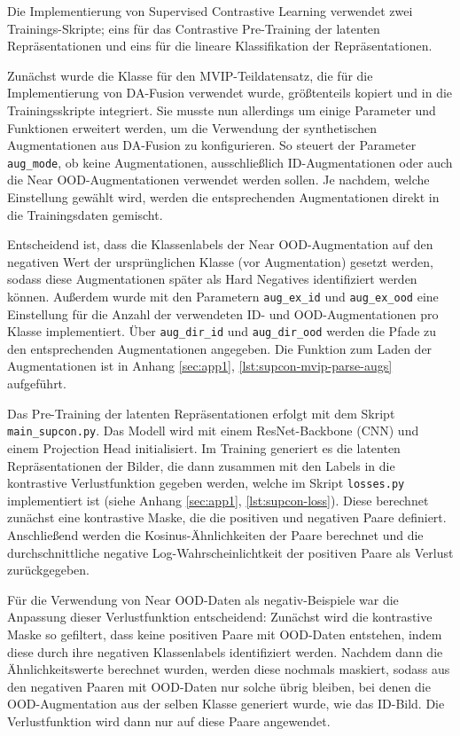 Die Implementierung von Supervised Contrastive Learning verwendet zwei Trainings-Skripte; eins für das Contrastive Pre-Training der latenten Repräsentationen und eins für die lineare Klassifikation der Repräsentationen.

Zunächst wurde die Klasse für den MVIP-Teildatensatz, die für die Implementierung von DA-Fusion verwendet wurde, größtenteils kopiert und in die Trainingsskripte integriert. Sie musste nun allerdings um einige Parameter und Funktionen erweitert werden, um die Verwendung der synthetischen Augmentationen aus DA-Fusion zu konfigurieren. So steuert der Parameter \lstinline{aug_mode}, ob keine Augmentationen, ausschließlich ID-Augmentationen oder auch die Near OOD-Augmentationen verwendet werden sollen. Je nachdem, welche Einstellung gewählt wird, werden die entsprechenden Augmentationen direkt in die Trainingsdaten gemischt. %

Entscheidend ist, dass die Klassenlabels der Near OOD-Augmentation auf den negativen Wert der ursprünglichen Klasse (vor Augmentation) gesetzt werden, sodass diese Augmentationen später als Hard Negatives identifiziert werden können. Außerdem wurde mit den Parametern \lstinline{aug_ex_id} und \lstinline{aug_ex_ood} eine Einstellung für die Anzahl der verwendeten ID- und OOD-Augmentationen pro Klasse implementiert. Über \lstinline{aug_dir_id} und \lstinline{aug_dir_ood} werden die Pfade zu den entsprechenden Augmentationen angegeben. Die Funktion zum Laden der Augmentationen ist in Anhang \ref{sec:app1}, \autoref{lst:supcon-mvip-parse-augs} aufgeführt.

Das Pre-Training der latenten Repräsentationen erfolgt mit dem Skript \lstinline{main_supcon.py}. Das Modell wird mit einem ResNet-Backbone (CNN) und einem Projection Head initialisiert. Im Training generiert es die latenten Repräsentationen der Bilder, die dann zusammen mit den Labels in die kontrastive Verlustfunktion gegeben werden, welche im Skript \lstinline{losses.py} implementiert ist (siehe Anhang \ref{sec:app1}, \autoref{lst:supcon-loss}). Diese berechnet zunächst eine kontrastive Maske, die die positiven und negativen Paare definiert. Anschließend werden die Kosinus-Ähnlichkeiten der Paare berechnet und die durchschnittliche negative Log-Wahrscheinlichtkeit der positiven Paare als Verlust zurückgegeben.

Für die Verwendung von Near OOD-Daten als negativ-Beispiele war die Anpassung dieser Verlustfunktion entscheidend: Zunächst wird die kontrastive Maske so gefiltert, dass keine positiven Paare mit OOD-Daten entstehen, indem diese durch ihre negativen Klassenlabels identifiziert werden. Nachdem dann die Ähnlichkeitswerte berechnet wurden, werden diese nochmals maskiert, sodass aus den negativen Paaren mit OOD-Daten nur solche übrig bleiben, bei denen die OOD-Augmentation aus der selben Klasse generiert wurde, wie das ID-Bild. Die Verlustfunktion wird dann nur auf diese Paare angewendet.

